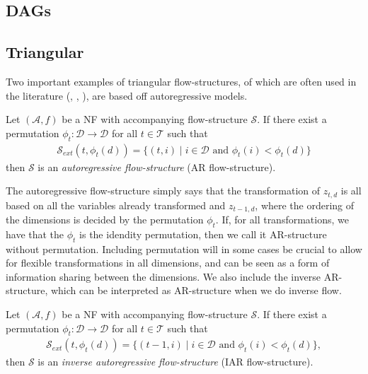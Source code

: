 \subsection{DAGs}
\subsection{Triangular}
Two important examples of triangular flow-structures, of which are often used in the literature
(\cite{maf}, \cite{iaf}, \cite{naf}), are based off autoregressive models. 
\begin{definition}
    Let \((\mathcal{A}, f)\) be a NF with accompanying flow-structure \(\mathcal{S}\). If
    there exist a permutation \(\phi_t\colon \mathcal{D} \rightarrow \mathcal{D}\)
    for all \(t \in \mathcal{T}\) such that
    \begin{align*}
        \mathcal{S}_{ext}(t,\phi_t(d)) = \{(t,i) \mid i \in \mathcal{D} \text{ and } \phi_t(i) < \phi_t(d)\}  
    \end{align*}
    then \(\mathcal{S}\) is an \emph{autoregressive flow-structure} (AR flow-structure).
\end{definition}
The autoregressive flow-structure simply says that the transformation of \(z_{t,d}\) is all based on
all the variables already transformed and \(z_{t-1,d}\), where the ordering of the dimensions is decided
by the permutation \(\phi_t\). If, for all transformations, we have that the \(\phi_t\) is the idendity permutation,
then we call it AR-structure without permutation. Including permutation will in some cases be crucial to 
allow for flexible transformations in all dimensions, and can be seen as a form of information sharing between
the dimensions. We also include the inverse AR-structure, which can be interpreted as AR-structure when we
do inverse flow.
\begin{definition}
    Let \((\mathcal{A}, f)\) be a NF with accompanying flow-structure \(\mathcal{S}\). If
    there exist a permutation \(\phi_t\colon \mathcal{D} \rightarrow \mathcal{D}\)
    for all \(t \in \mathcal{T}\) such that
    \begin{align*}
        \mathcal{S}_{ext}(t,\phi_t(d)) = \{(t-1,i) \mid i \in \mathcal{D} \text{ and } \phi_t(i) < \phi_t(d)\},
    \end{align*}
    then \(\mathcal{S}\) is an \emph{inverse autoregressive flow-structure} (IAR flow-structure).
\end{definition}
